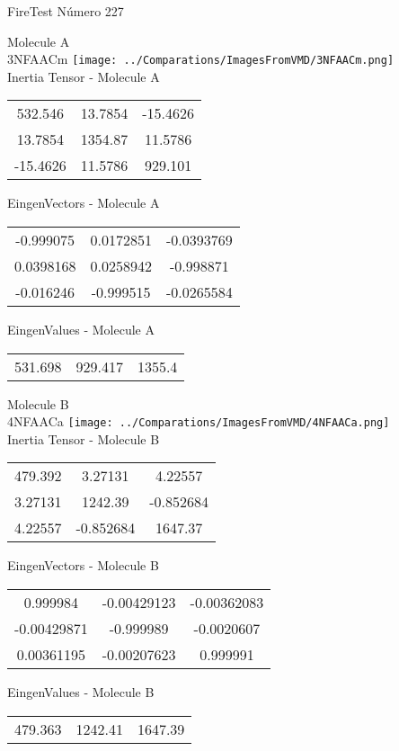 \vtab[-2cm]
\begin{center}
{\large FireTest \tab Número 227}
\end{center}
\begin{multicols}{2}
\begin{center}

Molecule A \\ 
3NFAACm
\texttt{[image: ../Comparations/ImagesFromVMD/3NFAACm.png]}
\\
Inertia Tensor - Molecule A \\
\vtab

\begin{tabular}{|c c c|}
532.546	 & 	13.7854	 & 	-15.4626	 \\
13.7854	 & 	1354.87	 & 	11.5786	 \\
-15.4626	 & 	11.5786	 & 	929.101
\end{tabular}

\vtab
 EingenVectors - Molecule A     \\
\vtab
\begin{tabular}{|c c c|}
-0.999075	 & 	0.0172851	 & 	-0.0393769	 \\
0.0398168	 & 	0.0258942	 & 	-0.998871	 \\
-0.016246	 & 	-0.999515	 & 	-0.0265584
\end{tabular}

\vtab
 EingenValues - Molecule A     \\
\vtab
\begin{tabular}{|c c c|}
531.698	 & 	929.417	 & 	1355.4	 \\
\end{tabular}
\columnbreak

Molecule B \\ 
4NFAACa
\texttt{[image: ../Comparations/ImagesFromVMD/4NFAACa.png]}
\\
Inertia Tensor - Molecule B \\
\vtab

\begin{tabular}{|c c c|}
479.392	 & 	3.27131	 & 	4.22557	 \\
3.27131	 & 	1242.39	 & 	-0.852684	 \\
4.22557	 & 	-0.852684	 & 	1647.37
\end{tabular}

\vtab
 EingenVectors - Molecule B     \\
\vtab
\begin{tabular}{|c c c|}
0.999984	 & 	-0.00429123	 & 	-0.00362083	 \\
-0.00429871	 & 	-0.999989	 & 	-0.0020607	 \\
0.00361195	 & 	-0.00207623	 & 	0.999991
\end{tabular}

\vtab
 EingenValues - Molecule B     \\
\vtab
\begin{tabular}{|c c c|}
479.363	 & 	1242.41	 & 	1647.39	 \\
\end{tabular}

\end{center}
\end{multicols}
